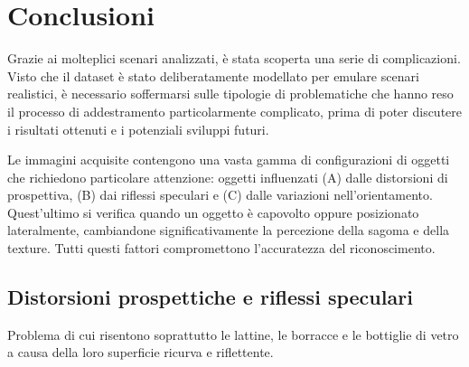 \documentclass[../main.tex]{subfiles}
\begin{document}
\chapter{Conclusioni}
\label{chap:conclusions}

Grazie ai molteplici scenari analizzati, è stata scoperta una serie di complicazioni. Visto che il dataset è stato deliberatamente modellato per emulare scenari realistici, è necessario soffermarsi sulle tipologie di problematiche che hanno reso il processo di addestramento particolarmente complicato, prima di poter discutere i risultati ottenuti e i potenziali sviluppi futuri.

\noindent
Le immagini acquisite contengono una vasta gamma di configurazioni di oggetti che richiedono particolare attenzione: oggetti influenzati (A) dalle distorsioni di prospettiva, (B) dai riflessi speculari e (C) dalle variazioni nell'orientamento. Quest'ultimo si verifica quando un oggetto è capovolto oppure posizionato lateralmente, cambiandone significativamente la percezione della sagoma e della texture. Tutti questi fattori compromettono l'accuratezza del riconoscimento.

\clearpage

\section{Distorsioni prospettiche e riflessi speculari}

Problema di cui risentono soprattutto le lattine, le borracce e le bottiglie di vetro a causa della loro superficie ricurva e riflettente.
\end{document}

